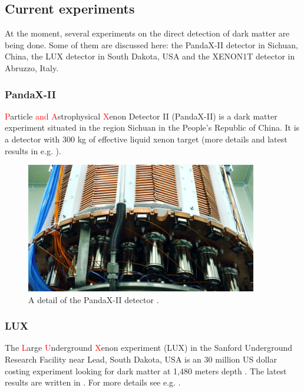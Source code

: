 \documentclass{article}
\begin{document}


\subsection{Current experiments}
\label{sec:current_exp}
At the moment, several experiments on the direct detection of dark matter are being done. Some of them are discussed here: the PandaX-II detector in Sichuan, China, the LUX detector in South Dakota, USA and the XENON1T detector in Abruzzo, Italy.

\subsubsection{PandaX-II}
\label{sec:PandaX}\textcolor{red}{P}article \textcolor{red}{and A}strophysical \textcolor{red}{X}enon Detector II (PandaX-II) is a dark matter experiment situated in the region Sichuan in the People's Republic of China. It is a detector with 300 kg of effective liquid xenon target \cite{Liu2015} (more details and latest results in e.g. \cite{Cui:2017nnn}).\\

\begin{figure}[h]
    \centering
    \includegraphics[width=0.9\textwidth]{pandax.jpg}
    \caption{A detail of the PandaX-II detector \cite{SJTU}.}
    \label{fig:PandaX}
\end{figure}

\subsubsection{LUX}
\label{sec:LUX}The \textcolor{red}{L}arge \textcolor{red}{U}nderground \textcolor{red}{X}enon experiment (LUX) in the Sanford Underground Research Facility near Lead, South Dakota, USA is an 30 million US dollar costing experiment looking for dark matter at 1,480 meters depth \cite{Reich2013}. The latest results are written in \cite{Akerib:2016vxi}. For more details see e.g. \cite{Akerib:2012ys}.
\end{document}
